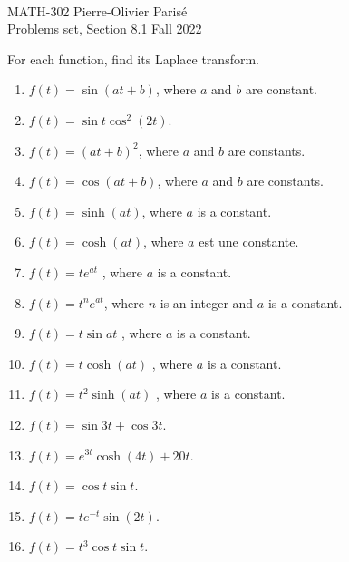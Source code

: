 \documentclass[12pt]{article}
\newcommand{\spc}{\vspace*{0.5cm}}
\begin{document}
	\noindent \hrulefill \\
	MATH-302 \hfill Pierre-Olivier Paris{\'e}\\
	Problems set, Section 8.1 \hfill Fall 2022\\\vspace*{-1cm}
	
	\noindent\hrulefill
	
	\spc
	
	For each function, find its Laplace transform.
	
	\begin{enumerate}[label=\textcolor{blue}{\arabic*)}]
	\item $f(t) = \sin (at + b)$, where $a$ and $b$ are constant.
	\item $f(t) = \sin t \cos^2 (2t)$.
	\item $f(t) = (at + b)^2$, where $a$ and $b$ are constants.
	\item $f(t) = \cos (a t + b )$, where $a$ and $b$ are constants.
	\item $f(t) = \sinh (at )$, where $a$ is a constant.
	\item $f(t) = \cosh (at )$, where $a$ est une constante.
	\item $f(t) = te^{at}$ , where $a$ is a constant.
	\item $f(t) = t^n e^{at}$, where $n$ is an integer and $a$ is a constant.
	\item $f(t) = t \sin at$ , where $a$ is a constant.
	\item $f(t) = t \cosh (at )$ , where $a$ is a constant.
	\item $f(t) = t^2 \sinh (at)$ , where $a$ is a constant.
	\item $f(t) = \sin 3t + \cos 3t$.
	\item $f(t) = e^{3t} \cosh (4t ) + 20t $.
	\item $f(t) = \cos t \sin t$.
	\item $f(t) = te^{-t} \sin (2t )$.
	\item $f(t) = t^3 \cos t \sin t$.
	\end{enumerate}
	


\newpage
\end{document}
